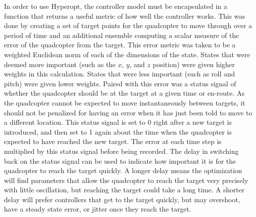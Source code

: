 \documentclass[letterpaper,12pt,titlepage,oneside,final]{book}
\begin{document}
In order to use Hyperopt, the controller model must be encapsulated in a function that returns a useful metric of how well the controller works.
This was done by creating a set of target points for the quadcopter to move through over a period of time and an additional ensemble computing a scalar measure of the error of the quadcopter from the target. 
This error metric was taken to be a weighted Euclidean norm of each of the dimensions of the state.
States that were deemed more important (such as the $x$, $y$, and $z$ position) were given higher weights in this calculation.
States that were less important (such as roll and pitch) were given lower weights. 
Paired with this error was a status signal of whether the quadcopter should be at the target at a given time or en-route.
As the quadcopter cannot be expected to move instantaneously between targets, it should not be penalized for having an error when it has just been told to move to a different location. 
This status signal is set to 0 right after a new target is introduced, and then set to 1 again about the time when the quadcopter is expected to have reached the new target. The error at each time step is multiplied by this status signal before being recorded. 
The delay in switching back on the status signal can be used to indicate how important it is for the quadcopter to reach the target quickly. 
A longer delay means the optimization will find parameters that allow the quadcopter to reach the target very precisely with little oscillation, but reaching the target could take a long time. 
A shorter delay will prefer controllers that get to the target quickly, but may overshoot, have a steady state error, or jitter once they reach the target.
\end{document}
